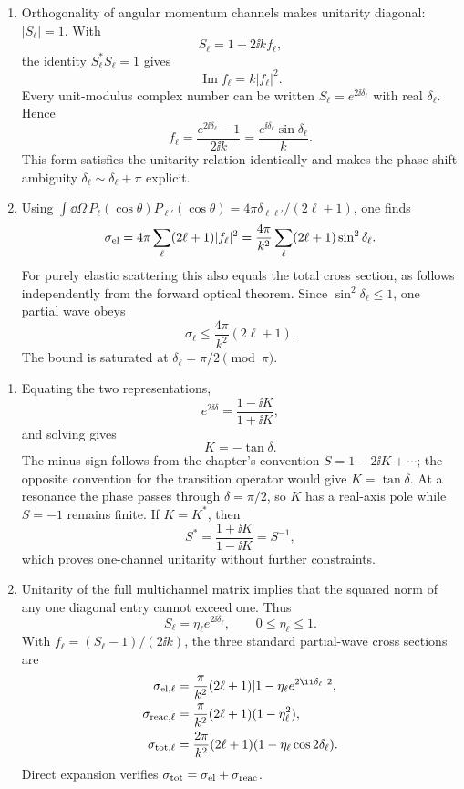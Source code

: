 \begin{enumerate}
\begin{enumerate}
\item
Orthogonality of angular momentum channels makes unitarity diagonal:
\(|S_\ell|=1\).  With
\[
 S_\ell=1+2\ii kf_\ell,
\]
the identity \(S_\ell^*S_\ell=1\) gives
\[
 \operatorname{Im}f_\ell=k|f_\ell|^2.
\]
Every unit-modulus complex number can be written
\(S_\ell=e^{2\ii\delta_\ell}\) with real \(\delta_\ell\).  Hence
\[
 f_\ell=\frac{e^{2\ii\delta_\ell}-1}{2\ii k}
 =\frac{e^{\ii\delta_\ell}\sin\delta_\ell}{k}.
\]
This form satisfies the unitarity relation identically and makes the
phase-shift ambiguity \(\delta_\ell\sim\delta_\ell+\pi\) explicit.
\item
Using
\(\int \dd\Omega\,P_\ell(\cos\theta)P_{\ell'}(\cos\theta)
=4\pi\delta_{\ell\ell'}/(2\ell+1)\), one finds
\[
 \sigma_{\rm el}
 =4\pi\sum_\ell(2\ell+1)|f_\ell|^2
 =\frac{4\pi}{k^2}
 \sum_\ell(2\ell+1)\sin^2\delta_\ell.
\]
For purely elastic scattering this also equals the total cross section,
as follows independently from the forward optical theorem.  Since
\(\sin^2\delta_\ell\leq1\), one partial wave obeys
\[
 \sigma_\ell\leq\frac{4\pi}{k^2}(2\ell+1).
\]
The bound is saturated at
\(\delta_\ell=\pi/2\pmod{\pi}\).
\end{enumerate}

\begin{enumerate}
\item
Equating the two representations,
\[
 e^{2\ii\delta}=\frac{1-\ii K}{1+\ii K},
\]
and solving gives
\[
 K=-\tan\delta.
\]
The minus sign follows from the chapter's convention
\(S=1-2\ii K+\cdots\); the opposite convention for the transition operator
would give \(K=\tan\delta\).  At a resonance the phase passes through
\(\delta=\pi/2\), so \(K\) has a real-axis pole while \(S=-1\) remains
finite.  If \(K=K^*\), then
\[
 S^*=\frac{1+\ii K}{1-\ii K}=S^{-1},
\]
which proves one-channel unitarity without further constraints.
\item
Unitarity of the full multichannel matrix implies that the squared norm
of any one diagonal entry cannot exceed one.  Thus
\[
 S_\ell=\eta_\ell e^{2\ii\delta_\ell},\qquad
 0\leq\eta_\ell\leq1.
\]
With \(f_\ell=(S_\ell-1)/(2\ii k)\), the three standard partial-wave
cross sections are
\[
 \begin{split}
 \sigma_{{\rm el},\ell}
 &=\frac{\pi}{k^2}(2\ell+1)
 |1-\eta_\ell e^{2\ii\delta_\ell}|^2,\\
 \sigma_{{\rm reac},\ell}
 &=\frac{\pi}{k^2}(2\ell+1)(1-\eta_\ell^2),\\
 \sigma_{{\rm tot},\ell}
 &=\frac{2\pi}{k^2}(2\ell+1)
 (1-\eta_\ell\cos2\delta_\ell).
 \end{split}
\]
Direct expansion verifies
\(\sigma_{\rm tot}=\sigma_{\rm el}+\sigma_{\rm reac}\).
\end{enumerate}


\end{enumerate}
